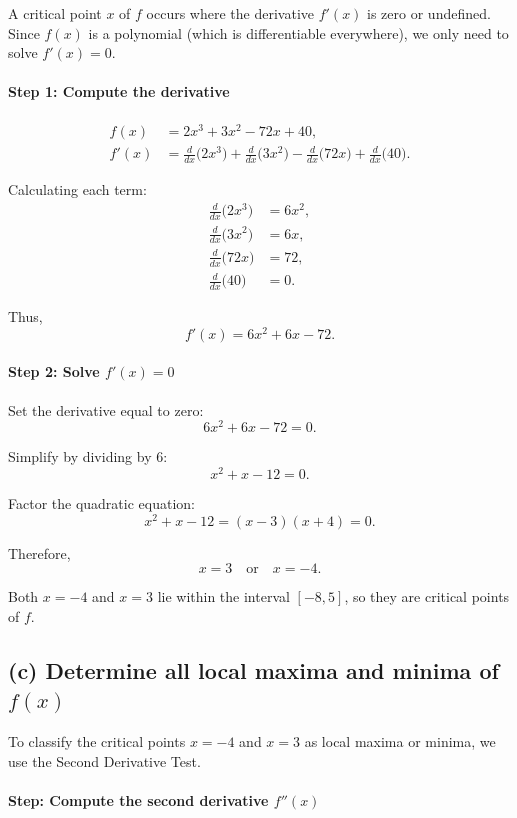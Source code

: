 \documentclass[12pt]{article}
\begin{document}
A critical point \(x\) of \(f\) occurs where the derivative \(f'(x)\) is zero or undefined. Since \(f(x)\) is a polynomial (which is differentiable everywhere), we only need to solve \(f'(x) = 0\).

\paragraph{Step 1: Compute the derivative}

\[
\begin{aligned}
f(x) &= 2x^3 + 3x^2 - 72x + 40,\\[6pt]
f'(x) &= \frac{d}{dx}\bigl(2x^3\bigr) 
      + \frac{d}{dx}\bigl(3x^2\bigr) 
      - \frac{d}{dx}\bigl(72x\bigr) 
      + \frac{d}{dx}\bigl(40\bigr).
\end{aligned}
\]

Calculating each term:
\begin{align*}
\frac{d}{dx}\bigl(2x^3\bigr) &= 6x^2, \\
\frac{d}{dx}\bigl(3x^2\bigr) &= 6x, \\
\frac{d}{dx}\bigl(72x\bigr) &= 72, \\
\frac{d}{dx}\bigl(40\bigr) &= 0.
\end{align*}

Thus,
\[
\boxed{
f'(x) = 6x^2 + 6x - 72.
}
\]

\paragraph{Step 2: Solve \(f'(x) = 0\)}

Set the derivative equal to zero:
\[
6x^2 + 6x - 72 = 0.
\]

Simplify by dividing by 6:
\[
x^2 + x - 12 = 0.
\]

Factor the quadratic equation:
\[
x^2 + x - 12 = (x - 3)(x + 4) = 0.
\]

Therefore,
\[
\boxed{x = 3 \quad \text{or} \quad x = -4}.
\]

Both \(x = -4\) and \(x = 3\) lie within the interval \([-8, 5]\), so they are critical points of \(f\).
\newpage
\subsection*{(c) Determine all local maxima and minima of \( f(x) \)}


To classify the critical points \(x = -4\) and \(x = 3\) as local maxima or minima, we use the Second Derivative Test.

\paragraph{Step: Compute the second derivative \(f''(x)\)}
\end{document}
